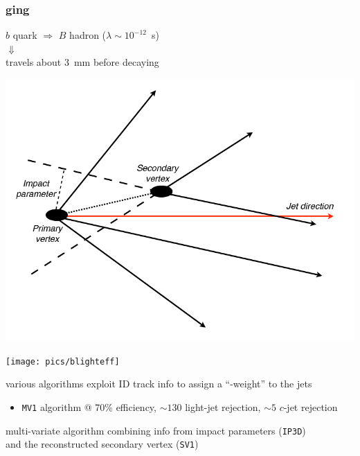 \begin{frame}\frametitle{\btag ging}
\centering\footnotesize

\begin{minipage}{.5\textwidth}\centering

$b$ quark $\Rightarrow$ $B$ hadron ($\lambda\sim 10^{-12}$~s)\\
{\large$\Downarrow$}\\
travels about 3~mm before decaying

\includegraphics[width=.5\textwidth]{../objectsreconstruction/figures/Picture-b-tagging-2.png}

\end{minipage}\begin{minipage}{.5\textwidth}\centering

\texttt{[image: pics/blighteff]}

\end{minipage}

\myskip

various algorithms exploit ID track info to assign a ``\btag-weight'' to the jets

\begin{itemize}
\item \texttt{\cccolor MV1} algorithm @ 70\% efficiency, $\sim 130$ light-jet rejection, $\sim 5$ $c$-jet rejection
\end{itemize}

multi-variate algorithm combining info from {\cccolor impact parameters} (\texttt{IP3D}) \\
and the {\cccolor reconstructed secondary vertex} (\texttt{SV1})

\end{frame}



